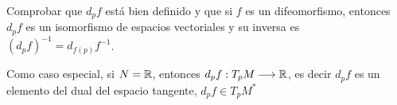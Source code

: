 \begin{exercise}
  Comprobar que $d_pf$ está bien definido y que si $f$ es un difeomorfismo, entonces $d_pf$ es
  un isomorfismo de espacios vectoriales y su inversa es $(d_pf)^{-1}=d_{f(p)}f^{-1}$.
\end{exercise}

Como caso especial, si $N=\mathbb{R}$, entonces $d_pf:T_pM\longrightarrow \mathbb{R}$, es decir $d_p f$ es un
elemento del dual del espacio tangente, $d_p f\in T_pM^*$